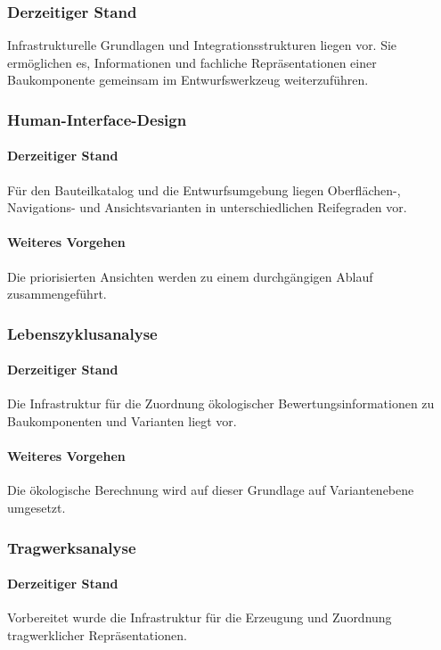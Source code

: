 \documentclass[type=zwischenbericht]{zukunftbau}
\begin{document}
\subsubsection{Derzeitiger Stand}
Infrastrukturelle Grundlagen und Integrationsstrukturen liegen vor. Sie ermöglichen es, Informationen und fachliche Repräsentationen einer Baukomponente gemeinsam im Entwurfswerkzeug weiterzuführen.

\subsubsection{Human-Interface-Design}

\paragraph{Derzeitiger Stand}
Für den Bauteilkatalog und die Entwurfsumgebung liegen Oberflächen-, Navigations- und Ansichtsvarianten in unterschiedlichen Reifegraden vor.

\paragraph{Weiteres Vorgehen}
Die priorisierten Ansichten werden zu einem durchgängigen Ablauf zusammengeführt.

\subsubsection{Lebenszyklusanalyse}

\paragraph{Derzeitiger Stand}
Die Infrastruktur für die Zuordnung ökologischer Bewertungsinformationen zu Baukomponenten und Varianten liegt vor.

\paragraph{Weiteres Vorgehen}
Die ökologische Berechnung wird auf dieser Grundlage auf Variantenebene umgesetzt.

\subsubsection{Tragwerksanalyse}

\paragraph{Derzeitiger Stand}
Vorbereitet wurde die Infrastruktur für die Erzeugung und Zuordnung tragwerklicher Repräsentationen.
\end{document}

